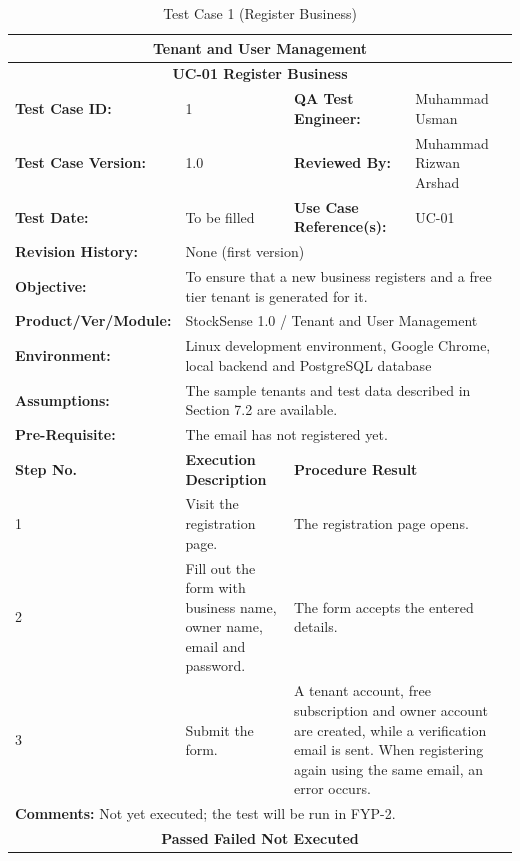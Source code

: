 \documentclass{StockSense}
\begin{document}
\begin{table}[!htbp]
\centering
\caption{Test Case 1 (Register Business)}
{\small\linespread{1}\selectfont
\begin{tabular}{|p{}|p{}|p{}|p{}|}
\hline
\multicolumn{4}{|c|}{\textbf{Tenant and User Management}} \\ \hline
\multicolumn{4}{|c|}{\textbf{UC-01 Register Business}} \\ \hline
\textbf{Test Case ID:} & 1 & \textbf{QA Test Engineer:} & Muhammad Usman \\ \hline
\textbf{Test Case Version:} & 1.0 & \textbf{Reviewed By:} & Muhammad Rizwan Arshad \\ \hline
\textbf{Test Date:} & To be filled & \textbf{Use Case Reference(s):} & UC-01 \\ \hline
\textbf{Revision History:} & \multicolumn{3}{p{\dimexpr0.70\textwidth+4\tabcolsep\relax}|}{None (first version)} \\ \hline
\textbf{Objective:} & \multicolumn{3}{p{\dimexpr0.70\textwidth+4\tabcolsep\relax}|}{To ensure that a new business registers and a free tier tenant is generated for it.} \\ \hline
\textbf{Product/Ver/Module:} & \multicolumn{3}{p{\dimexpr0.70\textwidth+4\tabcolsep\relax}|}{StockSense 1.0 / Tenant and User Management} \\ \hline
\textbf{Environment:} & \multicolumn{3}{p{\dimexpr0.70\textwidth+4\tabcolsep\relax}|}{Linux development environment, Google Chrome, local backend and PostgreSQL database} \\ \hline
\textbf{Assumptions:} & \multicolumn{3}{p{\dimexpr0.70\textwidth+4\tabcolsep\relax}|}{The sample tenants and test data described in Section 7.2 are available.} \\ \hline
\textbf{Pre-Requisite:} & \multicolumn{3}{p{\dimexpr0.70\textwidth+4\tabcolsep\relax}|}{The email has not registered yet.} \\ \hline
\textbf{Step No.} & \textbf{Execution Description} & \multicolumn{2}{l|}{\textbf{Procedure Result}} \\ \hline
1 & Visit the registration page. & \multicolumn{2}{p{\dimexpr0.42\textwidth+2\tabcolsep\relax}|}{The registration page opens.} \\ \hline
2 & Fill out the form with business name, owner name, email and password. & \multicolumn{2}{p{\dimexpr0.42\textwidth+2\tabcolsep\relax}|}{The form accepts the entered details.} \\ \hline
3 & Submit the form. & \multicolumn{2}{p{\dimexpr0.42\textwidth+2\tabcolsep\relax}|}{A tenant account, free subscription and owner account are created, while a verification email is sent. When registering again using the same email, an error occurs.} \\ \hline
\multicolumn{4}{|l|}{\textbf{Comments:} Not yet executed; the test will be run in FYP-2.} \\ \hline
\multicolumn{4}{|c|}{\textbf{Passed \quad Failed \quad Not Executed}} \\ \hline
\end{tabular}\par}
\end{table}
\end{document}
